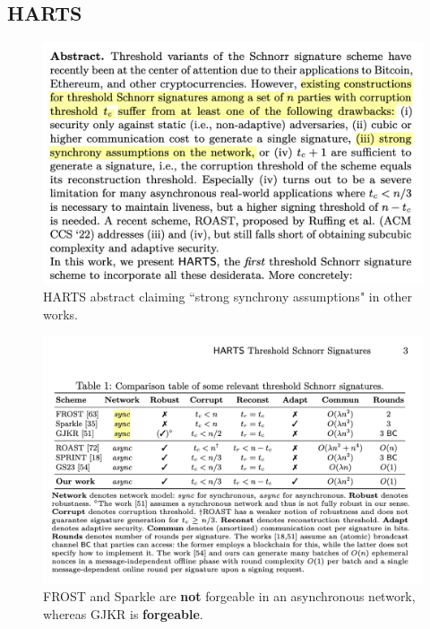 \subsection{HARTS}

\begin{figure}
    \centering
    \includegraphics[width=1\linewidth]{images/HARTS_abstract.png}
    \caption{HARTS abstract claiming ``strong synchrony assumptions" in other works.}
\end{figure}

\begin{figure}
    \centering
    \includegraphics[width=1\linewidth]{images/HARTS_table.png}
    \caption{FROST and Sparkle are \textbf{not} forgeable in an asynchronous network, whereas GJKR is \textbf{forgeable}.}
\end{figure}

